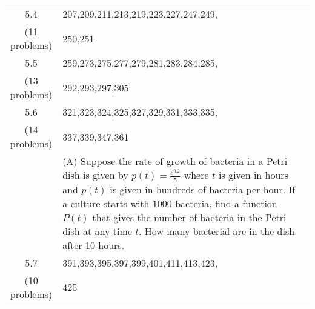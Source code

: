 \documentclass[11pt,fleqn]{article}
\begin{document}
\begin{tabularx}{\textwidth}{|c|| X | X | }
5.4&207,209,211,213,219,223,227,247,249,& \\ 
(11 problems)&250,251& \\ \hline

5.5&259,273,275,277,279,281,283,284,285,& \\ 
(13 problems)&292,293,297,305& \\ \hline

5.6&321,323,324,325,327,329,331,333,335,& \\ 
(14 problems)&337,339,347,361&\\
&(A) Suppose the rate of growth of bacteria in a Petri dish is given by $p(t)=\frac{e^{0.2}}{5}$ where $t$ is given in hours and $p(t)$ is given in hundreds of bacteria per hour. If a culture starts with $1000$ bacteria, find a function $P(t)$ that gives the number of bacteria in the Petri dish at any time $t.$ How many bacterial are in the dish after 10  hours. & \\ \hline

5.7&391,393,395,397,399,401,411,413,423,& \\ 
(10 problems) &425& \\ \hline


\end{tabularx}
\vfill
\end{document}
